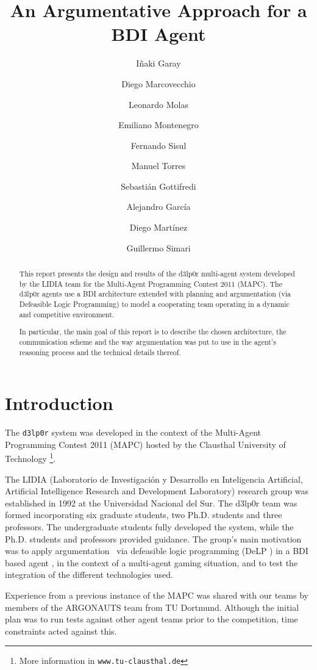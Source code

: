 \documentclass{llncs2e/llncs}
\title{An Argumentative Approach for a BDI Agent}
\author{I\~{n}aki Garay \and      %
        Diego Marcovecchio \and   %
        Leonardo Molas \and       %
        Emiliano Montenegro \and  %
        Fernando Sisul \and       %
        Manuel Torres \and        %
        Sebastián Gottifredi \and %
        Alejandro García \and     %
        Diego Martínez \and       %
        Guillermo Simari          %
        }
\institute{Universidad Nacional del Sur \\\email{\{igarai,diegomarcov,leos.molas,%
emm.montenegro,fsisul,jmtorresluc\}@gmail.com,\\\{sg,ajg,dcm,grs\}%
@cs.uns.edu.ar}}
\begin{document}
\maketitle

\begin{abstract}
    This report presents the design and results of the d3lp0r multi-agent system 
    developed by the LIDIA team for the Multi-Agent Programming Contest 2011 (MAPC).
    The d3lp0r agents use a BDI architecture extended with planning and 
    argumentation (via Defeasible Logic Programming) to model a cooperating team 
    operating in a dynamic and competitive environment.

    In particular, the main goal of this report is to describe the chosen 
    architecture, the communication scheme and the way argumentation was put to 
    use in the agent's reasoning process and the technical details thereof.
\end{abstract}

\section{Introduction}

    The \texttt{d3lp0r} system was developed in the context of the Multi-Agent
    Programming Contest 2011 (MAPC) \cite{BehrensAMAI2010b} hosted by the 
    Clausthal University of
    Technology \footnote{More information in \texttt{www.tu-clausthal.de}}.

    The LIDIA (Laboratorio de Investigación y Desarrollo en Inteligencia 
    Artificial, Artificial Intelligence Research and Development Laboratory) 
    research group was established in 1992 at the Universidad Nacional del Sur. 
    The d3lp0r team was formed incorporating six graduate students, two Ph.D. 
    students and three professors. The undergraduate students fully developed the 
    system, while the Ph.D. students and professors provided guidance. The group's 
    main motivation was to apply argumentation \cite{Prakken:1997}
    \cite{Rahwan:2009} \cite{Bench-Capon:2007}\ via defeasible logic programming 
    (DeLP \cite{Garcia:2004a}) in a BDI based agent \cite{Amgoud:2008}, in the context of a 
    multi-agent gaming situation, 
    and to test the integration of the different technologies used.

    Experience from a previous instance of the MAPC was shared with our teams by 
    members of the ARGONAUTS team from TU Dortmund. Although the initial 
    plan was to run tests against other agent teams prior to the competition, time 
    constraints acted against this.
\end{document}
